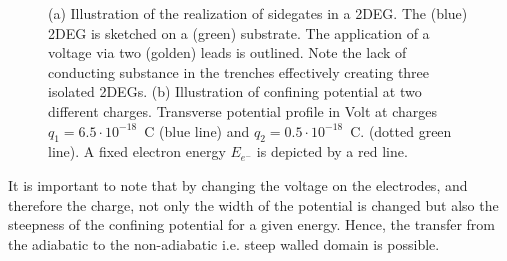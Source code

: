 \begin{figure}[h]
  \caption{(a) Illustration of the realization of sidegates in a 2DEG. The (blue) 2DEG is sketched on a (green) substrate. The application of a voltage via two (golden) leads is outlined. Note the lack of conducting substance in the trenches effectively creating three isolated 2DEGs. (b) Illustration of confining potential at two different charges. Transverse potential profile in Volt at charges $q_1 = 6.5 \cdot 10^{-18}$~C (blue line) and $q_2= 0.5 \cdot 10^{-18}$~C. (dotted green line). A fixed electron energy $E_{e^-}$ is depicted by a red line.} 
\end{figure}
It is important to note that by changing the voltage on the electrodes, and therefore the charge, not only the width of the potential is changed but also the steepness of the confining potential for a given energy. Hence, the transfer from the adiabatic to the non-adiabatic i.e. steep walled domain is possible.\par

